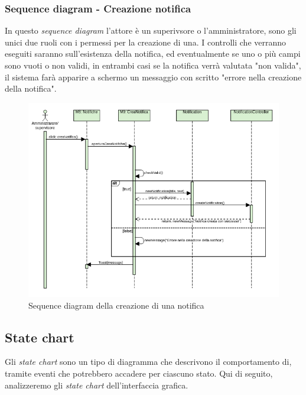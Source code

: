 \subsubsection{Sequence diagram - Creazione notifica}
In questo \textit{sequence diagram} l'attore è un superivsore o l'amministratore, sono gli unici due ruoli con i permessi per la creazione di una. I controlli che verranno eseguiti saranno sull'esistenza della notifica, ed eventualmente se uno o più campi sono vuoti o non validi, in entrambi casi se la notifica verrà valutata "non valida", il sistema farà apparire a schermo un messaggio con scritto "errore nella creazione della notifica".
\begin{figure}[H]
  \centering
  \includegraphics[scale=0.9]{img/sequence/creazioneNotifica_sequence_diagraem.png}
  \caption{Sequence diagram della creazione di una notifica}
\end{figure}  
\newpage
\subsection{State chart}
Gli \textit{state chart} sono un tipo di diagramma che descrivono il comportamento di, tramite eventi che potrebbero accadere per ciascuno stato.
Qui di seguito, analizzeremo gli \textit{state chart} dell'interfaccia grafica.
